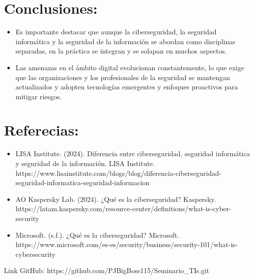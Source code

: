 \documentclass{article}
\begin{document}
\section{Conclusiones:}
\begin{itemize}
    \item Es importante destacar que aunque la ciberseguridad, la seguridad informática y la seguridad de la información se abordan como disciplinas separadas, en la práctica se integran y se solapan en muchos aspectos. 
    \item Las amenazas en el ámbito digital evolucionan constantemente, lo que exige que las organizaciones y los profesionales de la seguridad se mantengan actualizados y adopten tecnologías emergentes y enfoques proactivos para mitigar riesgos.
\end{itemize}

\section{Referecias:}
\begin{itemize}
    \item LISA Institute. (2024). Diferencia entre ciberseguridad, seguridad informática y seguridad de la información. LISA Institute. https://www.lisainstitute.com/blogs/blog/diferencia-ciberseguridad-seguridad-informatica-seguridad-informacion
    \item AO Kaspersky Lab. (2024). ¿Qué es la ciberseguridad? Kaspersky. https://latam.kaspersky.com/resource-center/definitions/what-is-cyber-security
    \item Microsoft. (s.f.). ¿Qué es la ciberseguridad? Microsoft. https://www.microsoft.com/es-es/security/business/security-101/what-is-cybersecurity
\end{itemize}

Link GitHub: https://github.com/PJBigBoss115/Seminario_TIs.git
\end{document}
